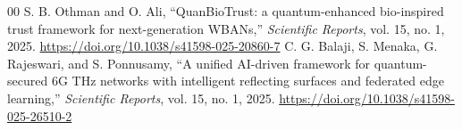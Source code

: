 \documentclass[conference]{IEEEtran}
\begin{document}
\begin{thebibliography}{00}
 S. B. Othman and O. Ali, ``QuanBioTrust: a quantum-enhanced bio-inspired trust framework for next-generation WBANs,'' \textit{Scientific Reports}, vol. 15, no. 1, 2025. \url{https://doi.org/10.1038/s41598-025-20860-7}
 C. G. Balaji, S. Menaka, G. Rajeswari, and S. Ponnusamy, ``A unified AI-driven framework for quantum-secured 6G THz networks with intelligent reflecting surfaces and federated edge learning,'' \textit{Scientific Reports}, vol. 15, no. 1, 2025. \url{https://doi.org/10.1038/s41598-025-26510-2}
\end{thebibliography}
\end{document}
